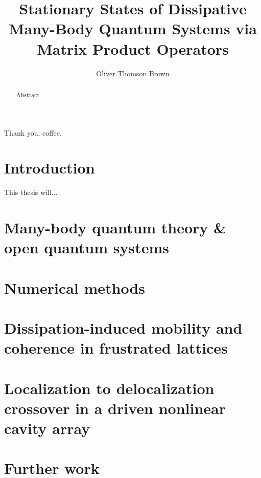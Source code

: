 \documentclass[a4paper,oneside,12pt]{hwthesis}
\author{Oliver Thomson Brown}
\title{Stationary States of Dissipative Many-Body Quantum Systems via Matrix Product Operators}
\newcommand*{\chappath}{../../include/chapters}
\begin{document}
\maketitle


\begin{acknowledgements}
Thank you, coffee.
\end{acknowledgements}

\begin{abstract}
Abstract
\end{abstract}

\tableofcontents

\chapter{Introduction}
\setcounter{page}{1}

This thesis will...

\chapter[MBQT \& OQS]{\label{chp:MBQOQS}Many-body quantum theory \& open quantum systems}



\chapter{\label{chp:NM}Numerical methods}



\chapter[Frustrated lattices]{\label{chp:DIM}Dissipation-induced mobility and coherence in frustrated lattices}



\chapter[Driven nonlinear cavity array]{\label{chp:DNLCA}Localization to delocalization crossover in a driven nonlinear cavity array}



\chapter{Further work}
\end{document}
